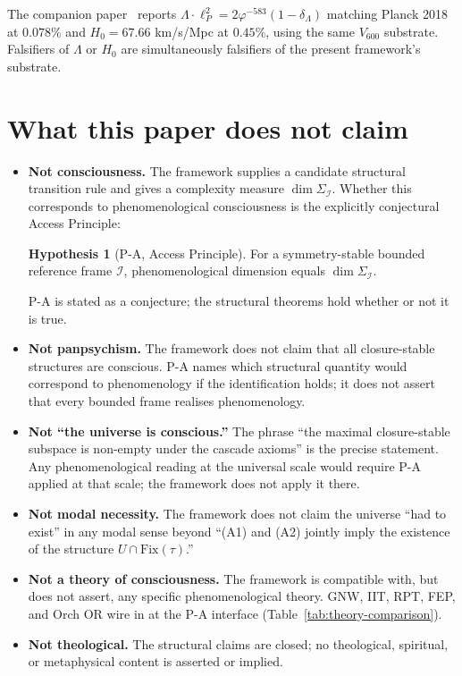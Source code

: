 \documentclass[11pt]{article}
\theoremstyle{plain}
\theoremstyle{definition}
\newtheorem{hypothesis}[theorem]{Hypothesis}
\theoremstyle{remark}
\newcommand{\Ical}{\mathcal{I}}
\newcommand{\Fix}{\mathrm{Fix}}
\begin{document}
The companion paper~\citep{SmartHypersphereCosmology} reports $\Lambda \cdot \ell_P^2 = 2 \varphi^{-583}(1 - \delta_\Lambda)$ matching Planck 2018 at $0.078\%$ and $H_0 = 67.66$ km/s/Mpc at $0.45\%$, using the same $V_{600}$ substrate. Falsifiers of $\Lambda$ or $H_0$ are simultaneously falsifiers of the present framework's substrate.

\section{What this paper does not claim}\label{sec:scope}

\begin{itemize}[leftmargin=2em]
\item \textbf{Not consciousness.} The framework supplies a candidate structural transition rule and gives a complexity measure $\dim \Sigma_\Ical$. Whether this corresponds to phenomenological consciousness is the explicitly conjectural Access Principle:
\begin{hypothesis}[P-A, Access Principle]\label{hyp:p-a}
For a symmetry-stable bounded reference frame $\Ical$, phenomenological dimension equals $\dim \Sigma_\Ical$.
\end{hypothesis}
P-A is stated as a conjecture; the structural theorems hold whether or not it is true.

\item \textbf{Not panpsychism.} The framework does not claim that all closure-stable structures are conscious. P-A names which structural quantity would correspond to phenomenology if the identification holds; it does not assert that every bounded frame realises phenomenology.

\item \textbf{Not ``the universe is conscious.''} The phrase ``the maximal closure-stable subspace is non-empty under the cascade axioms'' is the precise statement. Any phenomenological reading at the universal scale would require P-A applied at that scale; the framework does not apply it there.

\item \textbf{Not modal necessity.} The framework does not claim the universe ``had to exist'' in any modal sense beyond ``(A1) and (A2) jointly imply the existence of the structure $U \cap \Fix(\tau)$.''

\item \textbf{Not a theory of consciousness.} The framework is compatible with, but does not assert, any specific phenomenological theory. GNW, IIT, RPT, FEP, and Orch OR wire in at the P-A interface (Table~\ref{tab:theory-comparison}).

\item \textbf{Not theological.} The structural claims are closed; no theological, spiritual, or metaphysical content is asserted or implied.
\end{itemize}
\end{document}
